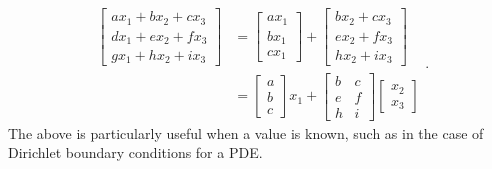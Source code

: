 \documentclass[ltr]{ornltm} %
\numberwithin{equation}{section}
\begin{document}
	\begin{equation}
		\label{eq:matrix-expansion}
		\begin{split}
			\begin{bmatrix}
				ax_1+bx_2+cx_3 \\
				dx_1+ex_2+fx_3 \\
				gx_1+hx_2+ix_3
			\end{bmatrix}
			&=
			\begin{bmatrix}
				ax_1 \\
				bx_1 \\
				cx_1
			\end{bmatrix}+\begin{bmatrix}
							  bx_2+cx_3 \\
							  ex_2+fx_3 \\
							  hx_2+ix_3
			\end{bmatrix}\\
			&=
			\begin{bmatrix}
				a \\
				b \\
				c
			\end{bmatrix}x_1 +
			\begin{bmatrix}
				b & c \\
				e & f \\
				h & i
			\end{bmatrix}\begin{bmatrix}
							 x_2 \\
							 x_3
			\end{bmatrix}
		\end{split}.
	\end{equation}
	The above is particularly useful when a value is known, such as in the case of Dirichlet boundary conditions for a PDE.


	\backmatter

\end{document}
